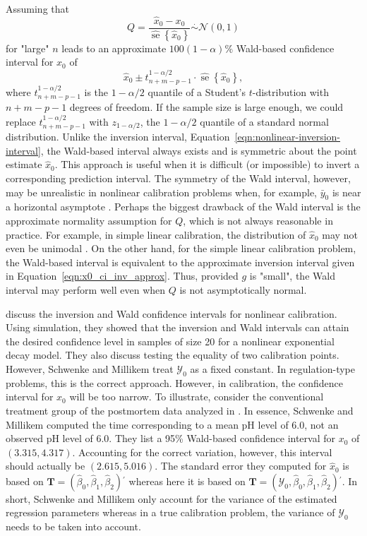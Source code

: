 \documentclass[cmfont,usenames,dvipsnames,leqno]{afit-etd}\usepackage[]{graphicx}\usepackage[]{color}
\newcommand{\trans}{\ensuremath{^\prime}}
\newcommand{\mc}[1]{\ensuremath{\mathcal{#1}}}
\newcommand{\wh}[1]{\ensuremath{\widehat{#1}}}
\newcommand{\se}{\operatorname{se}}
\begin{document}
Assuming that
\begin{equation}
\label{eqn:approx_pivot}
  Q = \frac{\wh{x}_0 - x_0}{\wh{\se}\left\{\wh{x}_0\right\}} \stackrel{\cdot}{\sim} \mc{N}(0, 1)
\end{equation}
for "large" $n$ leads to an approximate $100(1-\alpha)\%$ Wald-based confidence interval for $x_0$ of 
\begin{equation}
\label{eqn:x0_ci_wald}
  \wh{x}_0 \pm t_{n+m-p-1}^{1-\alpha/2} \cdot \wh{\se}\left\{\wh{x}_0\right\},
\end{equation}
where $t_{n+m-p-1}^{1-\alpha/2}$ is the $1-\alpha/2$ quantile of a Student's $t$-distribution with $n+m-p-1$ degrees of freedom. If the sample size is large enough, we could replace $t_{n+m-p-1}^{1-\alpha/2}$ with $z_{1-\alpha/2}$, the $1-\alpha/2$ quantile of a standard normal distribution. Unlike the inversion interval, Equation~\eqref{eqn:nonlinear-inversion-interval}, the Wald-based interval always exists and is symmetric about the point estimate $\wh{x}_0$. This approach is useful when it is difficult (or impossible) to invert a corresponding prediction interval. The symmetry of the Wald interval, however, may be unrealistic in nonlinear calibration problems when, for example, $\bar{y}_0$ is near a horizontal asymptote \citep{schwenke_callibration_1991}. Perhaps the biggest drawback of the Wald interval is the approximate normality assumption for $Q$, which is not always reasonable in practice. For example, in simple linear calibration, the distribution of $\wh{x}_0$ may not even be unimodal \citep{buonaccorsi_design_1986}. On the other hand, for the simple linear calibration problem, the Wald-based interval is equivalent to the approximate inversion interval given in Equation~\eqref{eqn:x0_ci_inv_approx}. Thus, provided $g$ is "small", the Wald interval may perform well even when $Q$ is not asymptotically normal.

\citet{schwenke_callibration_1991} discuss the inversion and Wald confidence intervals for nonlinear calibration. Using simulation, they showed that the inversion and Wald intervals can attain the desired confidence level in samples of size 20 for a nonlinear exponential decay model. They also discuss testing the equality of two calibration points. However, Schwenke and Millikem treat $\mc{Y}_0$ as a fixed constant. In regulation-type problems, this is the correct approach. However, in calibration, the confidence interval for $x_0$ will be too narrow. To illustrate, consider the conventional treatment group of the postmortem data analyzed in \citet{schwenke_callibration_1991}. In essence, Schwenke and Millikem computed the time corresponding to a mean pH level of 6.0, not an observed pH level of 6.0. They list a 95\% Wald-based confidence interval for $x_0$ of $(3.315, 4.317)$. Accounting for the correct variation, however, this interval should actually be $(2.615, 5.016)$. The standard error they computed for $\wh{x}_0$ is based on $\bm{T} = (\wh{\beta}_0, \wh{\beta}_1, \wh{\beta}_2)\trans$ whereas here it is based on $\bm{T} = (\mc{Y}_0, \wh{\beta}_0, \wh{\beta}_1, \wh{\beta}_2)\trans$. In short, Schwenke and Millikem only account for the variance of the estimated regression parameters whereas in a true calibration problem, the variance of $\mc{Y}_0$ needs to be taken into account. 
\end{document}
